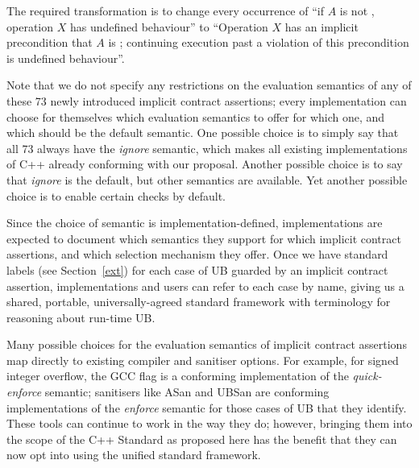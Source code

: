 The required transformation is to change every occurrence of “if $A$ is not , operation $X$ has undefined behaviour'' to ``Operation $X$ has an implicit precondition that $A$ is ; continuing execution past a violation of this precondition is undefined behaviour''.

Note that we do not specify any restrictions on the evaluation semantics of any of these 73 newly introduced  implicit contract assertions; every implementation can choose for themselves which evaluation semantics to offer for which one, and which should be the default semantic. One possible choice is to simply say that all 73 always have the \emph{ignore} semantic, which makes all existing implementations of C++ already conforming with our proposal. Another possible choice is to say that  \emph{ignore} is the default, but other semantics are available. Yet another possible choice is to enable certain checks by default.

Since the choice of semantic is implementation-defined, implementations are expected to document which semantics they support for which implicit contract assertions, and which selection mechanism they offer. Once we have standard labels (see Section~\ref{ext}) for each case of UB guarded by an implicit contract assertion, implementations and users can refer to each case by name, giving us a shared, portable, universally-agreed standard framework with terminology for reasoning about run-time UB.

Many possible choices for the evaluation semantics of implicit contract assertions map directly to existing compiler and sanitiser options. For example, for signed integer overflow, the GCC flag  is a conforming implementation of the \emph{quick-enforce} semantic; sanitisers like ASan and UBSan are conforming implementations of the \emph{enforce} semantic for those cases of UB that they identify. These tools can continue to work in the way they do; however, bringing them into the scope of the C++ Standard as proposed here has the benefit that they can now opt into using the unified standard framework.

